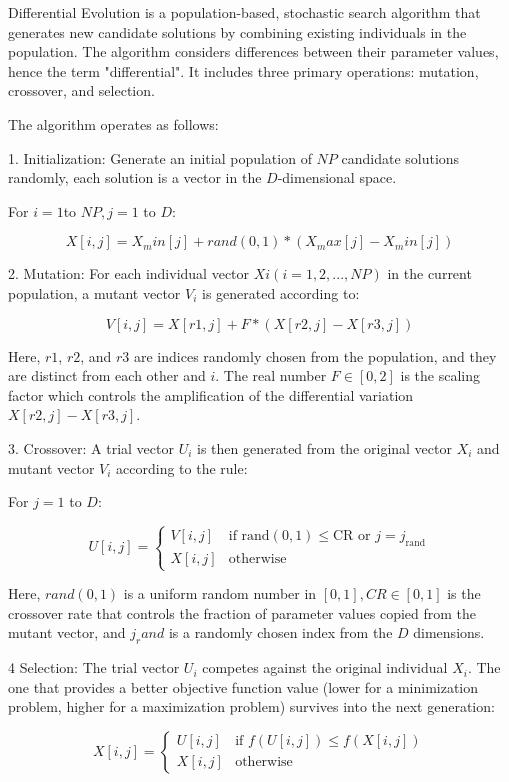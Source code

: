 \documentclass[a4paper,12pt]{article}
\begin{document}
Differential Evolution is a population-based, stochastic search algorithm that generates new candidate solutions by combining existing individuals in the population. The algorithm considers differences between their parameter values, hence the term "differential". It includes three primary operations: mutation, crossover, and selection.

The algorithm operates as follows:

1. Initialization: Generate an initial population of $NP$ candidate solutions randomly, each solution is a vector in the $D$-dimensional space.
    
    For $i = 1 $to $NP, j = 1$ to $D$:
    
    $$X[i, j] = X_min[j] + rand(0, 1) * (X_max[j] - X_min[j])$$
    
2. Mutation: For each individual vector $Xi (i=1, 2, ..., NP)$ in the current population, a mutant vector $V_i$ is generated according to:

    $$V[i, j] = X[r1, j] + F * (X[r2, j] - X[r3, j])$$

    Here, $r1$, $r2$, and $r3$ are indices randomly chosen from the population, and they are distinct from each other and $i$. The real number $F \in [0,2]$ is the scaling factor which controls the amplification of the differential variation $X[r2, j] - X[r3, j]$.

3. Crossover: A trial vector $U_i$ is then generated from the original vector $X_i$ and mutant vector $V_i$ according to the rule:

    For $j = 1$ to $D$:
    
    $$
        U[i, j] =
        \begin{cases}
            V[i, j] & \text{if } \text{rand}(0,1) \leq \text{CR} \text{ or } j = j_{\text{rand}} \\
            X[i, j] & \text{otherwise}
        \end{cases}
    $$

Here, $rand(0,1)$ is a uniform random number in $[0,1], CR \in [0,1]$ is the crossover rate that controls the fraction of parameter values copied from the mutant vector, and $j_rand$ is a randomly chosen index from the $D$ dimensions.

4 Selection: The trial vector $U_i$ competes against the original individual $X_i$. The one that provides a better objective function value (lower for a minimization problem, higher for a maximization problem) survives into the next generation:

        $$
        X[i, j] =
        \begin{cases}
            U[i, j] & \text{if } f(U[i, j]) \leq f(X[i, j]) \\
            X[i, j] & \text{otherwise}
        \end{cases}
        $$
\end{document}
